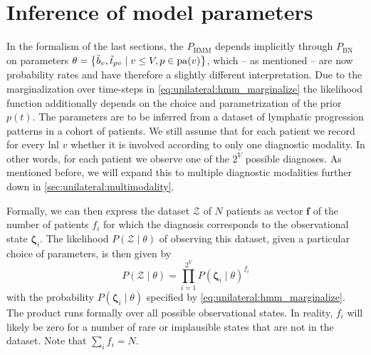 \documentclass[\relativeRoot/main.tex]{subfiles}
\begin{document}
\section{Inference of model parameters}
\label{sec:unilateral:inference}

In the formalism of the last sections, the $P_\text{HMM}$ depends implicitly through $P_\text{BN}$ on parameters $\theta = \left\{ \Tilde{b}_v , \Tilde{t}_{pv} \mid v \leq V , p \in \operatorname{pa}(v) \right\}$, which -- as mentioned -- are now probability rates and have therefore a slightly different interpretation. Due to the marginalization over time-steps in \cref{eq:unilateral:hmm_marginalize} the likelihood function additionally depends on the choice and parametrization of the prior $p(t)$. The parameters are to be inferred from a dataset of lymphatic progression patterns in a cohort of patients. We still assume that for each patient we record for every \gls{lnl} $v$ whether it is involved according to only one diagnostic modality. In other words, for each patient we observe one of the $2^V$ possible diagnoses. As mentioned before, we will expand this to multiple diagnostic modalities further down in \cref{sec:unilateral:multimodality}.

Formally, we can then express the dataset $\boldsymbol{\mathcal{Z}}$ of $N$ patients as vector $\mathbf{f}$ of the number of patients $f_i$ for which the diagnosis corresponds to the observational state $\boldsymbol{\zeta}_i$. The likelihood $P \left( \boldsymbol{\mathcal{Z}} \mid \theta \right)$ of observing this dataset, given a particular choice of parameters, is then given by
%
\begin{equation}
    P \left( \boldsymbol{\mathcal{Z}} \mid \theta \right) = \prod_{i=1}^{2^V}{P \left( \boldsymbol{\zeta}_i \mid \theta \right)^{f_i}}
\end{equation}
%
with the probability $P \left( \boldsymbol{\zeta}_i \mid \theta \right)$ specified by \cref{eq:unilateral:hmm_marginalize}. The product runs formally over all possible observational states. In reality, $f_i$ will likely be zero for a number of rare or implausible states that are not in the dataset. Note that $\sum_{i}{f_i} = N$.
\end{document}
